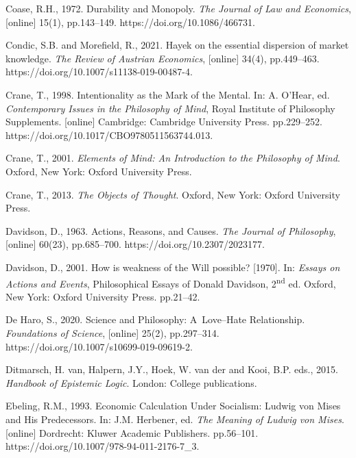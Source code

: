 Coase, R.H., 1972. Durability and Monopoly. \textit{The Journal of Law and Economics}, [online] 15(1), pp.143–149. https://doi.org/10.1086/466731.



Condic, S.B. and Morefield, R., 2021. Hayek on the essential dispersion of market knowledge. \textit{The Review of Austrian Economics}, [online] 34(4), pp.449–463. https://doi.org/10.1007/s11138-019-00487-4.



Crane, T., 1998. Intentionality as the Mark of the Mental. In: A. O'Hear, ed. \textit{Contemporary Issues in the Philosophy of Mind}, Royal Institute of Philosophy Supplements. [online] Cambridge: Cambridge University Press. pp.229–252. https://doi.org/10.1017/CBO9780511563744.013.



Crane, T., 2001. \textit{Elements of Mind: An Introduction to the Philosophy of Mind}. Oxford, New York: Oxford University Press.



Crane, T., 2013. \textit{The Objects of Thought}. Oxford, New York: Oxford University Press.



Davidson, D., 1963. Actions, Reasons, and Causes. \textit{The Journal of Philosophy}, [online] 60(23), pp.685–700. https://doi.org/10.2307/2023177.



Davidson, D., 2001. How is weakness of the Will possible? [1970]. In: \textit{Essays on Actions and Events}, Philosophical Essays of Donald Davidson, 2\textsuperscript{nd} ed. Oxford, New York: Oxford University Press. pp.21–42.



De Haro, S., 2020. Science and Philosophy: A~Love–Hate Relationship. \textit{Foundations of Science}, [online] 25(2), pp.297–314. https://doi.org/10.1007/s10699-019-09619-2.



Ditmarsch, H. van, Halpern, J.Y., Hoek, W. van der and Kooi, B.P. eds., 2015. \textit{Handbook of Epistemic Logic}. London: College publications.



Ebeling, R.M., 1993. Economic Calculation Under Socialism: Ludwig von Mises and His Predecessors. In: J.M. Herbener, ed. \textit{The Meaning of Ludwig von Mises}. [online] Dordrecht: Kluwer Academic Publishers. pp.56–101. https://doi.org/10.1007/978-94-011-2176-7\_3.



